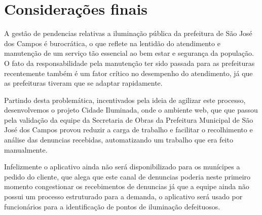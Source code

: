 \documentclass[
	article,			%
	11pt,				%
	oneside,			%
	a4paper,			%
	english,			%
	brazil,				%
	sumario=tradicional
	]{abntex2}
\begin{document}





%

\section*{Considerações finais}

A gestão de pendencias relativas a iluminação pública da prefeitura de São José
dos Campos é burocrática, o que reflete na lentidão do atendimento e manutenção
de um serviço tão essencial ao bem estar e segurança da população. O fato da
responsabilidade pela manutenção ter sido passada para as prefeituras recentemente
também é um fator crítico no desempenho do atendimento, já que as prefeituras
tiveram que se adaptar rapidamente.

Partindo desta problemática, incentivados pela ideia de agilizar este processo,
desenvolvemos o projeto Cidade Iluminada, onde o ambiente web, que que passou
pela validação da equipe da Secretaria de Obras da Prefeitura Municipal de São
José dos Campos provou reduzir a carga de trabalho e facilitar o recolhimento e
análise das denuncias recebidas, automatizando um trabalho que era feito manualmente.

Infelizmente o aplicativo ainda não será disponibilizado para os munícipes a
pedido do cliente, que alega que este canal de denuncias poderia  neste primeiro
momento congestionar os recebimentos de denuncias já que a equipe ainda não
possui um processo estruturado para a demanda, o aplicativo será usado por
funcionários para a identificação de pontos de iluminação defeituosos.
\end{document}
